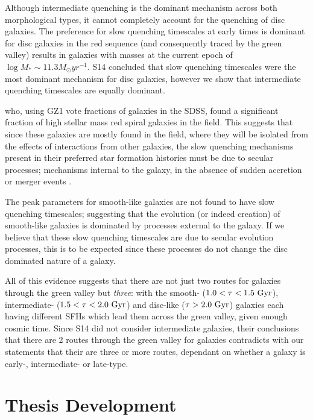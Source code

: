 \documentclass{mn2e}
\begin{document}
Although intermediate quenching is the dominant mechanism across both morphological types, it cannot completely account for the quenching of disc galaxies. The preference for slow quenching timescales at early times is dominant for disc galaxies in the red sequence (and consequently traced by the green valley) results in galaxies with masses at the current epoch of $\log M_* \sim 11.3 M_{\odot} yr^{-1}$. S14 concluded that slow quenching timescales were the most dominant mechanism for disc galaxies, however we show that intermediate quenching timescales are equally dominant. 

\citet{Bamford09} who, using GZ1 vote fractions of galaxies in the SDSS, found a significant fraction of high stellar mass red spiral galaxies in the field. This suggests that since these galaxies are mostly found in the field, where they will be isolated from the effects of interactions from other galaxies, the slow quenching mechanisms present in their preferred star formation histories must be due to secular processes; mechanisms internal to the galaxy, in the absence of sudden accretion or merger events \citep{KK04, Sheth12}.

The peak parameters for smooth-like galaxies are not found to have slow quenching timescales; suggesting that the evolution (or indeed creation) of smooth-like galaxies is dominated by processes external to the galaxy. If we believe that these slow quenching timescales are due to secular evolution processes, this is to be expected since these processes do not change the disc dominated nature of a galaxy. 

All of this evidence suggests that there are not just two routes for galaxies through the green valley but \emph{three}: with the smooth- ($1.0 < \tau < 1.5 ~\rm{Gyr}$), intermediate- ($1.5 < \tau < 2.0~\rm{Gyr}$) and disc-like ($\tau > 2.0~\rm{Gyr}$) galaxies each having different SFHs which lead them across the green valley, given enough cosmic time. Since S14 did not consider intermediate galaxies, their conclusions that there are 2 routes through the green valley for galaxies contradicts with our statements that their are three or more routes, dependant on whether a galaxy is early-, intermediate- or late-type. 



\section{Thesis Development}\label{thesis}
\end{document}
